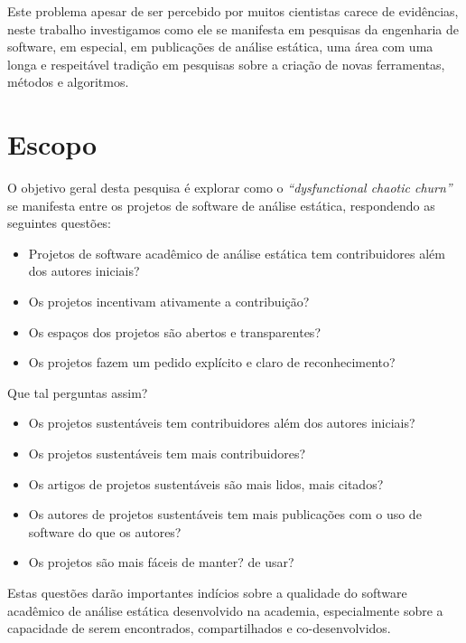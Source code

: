 
Este problema apesar de ser percebido por muitos cientistas carece de
evidências, neste trabalho investigamos como ele se manifesta em pesquisas da
engenharia de software, em especial, em publicações de análise estática, uma
área com uma longa e respeitável tradição em pesquisas sobre a criação de novas
ferramentas, métodos e algoritmos.

\section{Escopo}

O objetivo geral desta pesquisa é explorar como o {\it ``dysfunctional chaotic
churn''} se manifesta entre os projetos de software de análise estática,
respondendo as seguintes questões:

\begin{itemize}
  \item Projetos de software acadêmico de análise estática tem contribuidores além dos autores iniciais?
  \item Os projetos incentivam ativamente a contribuição?
  \item Os espaços dos projetos são abertos e transparentes?
  \item Os projetos fazem um pedido explícito e claro de reconhecimento?
\end{itemize}

Que tal perguntas assim?
\begin{itemize}

  \item Os projetos sustentáveis tem contribuidores além dos autores iniciais?
  \item Os projetos sustentáveis tem mais contribuidores?
  \item Os artigos de projetos sustentáveis são mais lidos, mais citados?
  \item Os autores de projetos sustentáveis tem mais publicações com o uso de software do que os autores?
  \item Os projetos são mais fáceis de manter?  de usar? 
\end{itemize}



Estas questões darão importantes indícios sobre a qualidade do software acadêmico de
análise estática desenvolvido na academia, especialmente sobre a capacidade de serem 
encontrados, compartilhados e co-desenvolvidos.

